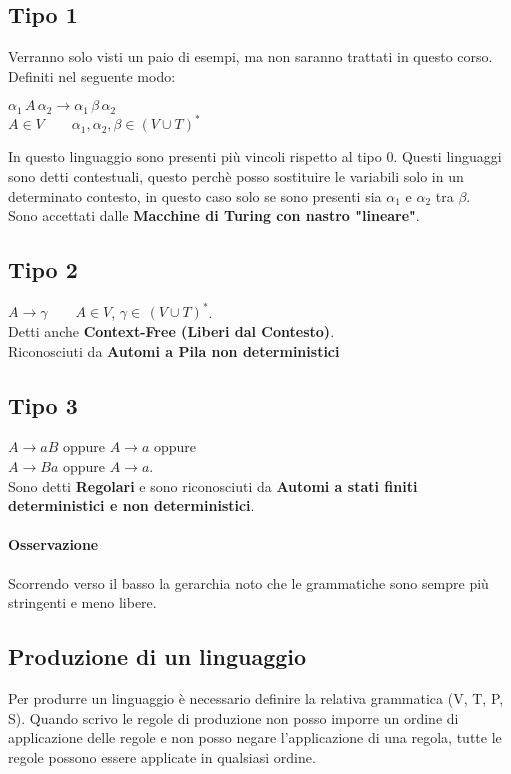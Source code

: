 \subsection{Tipo 1}
Verranno solo visti un paio di esempi, ma non saranno trattati in questo corso.
\\ Definiti nel seguente modo:
\begin{center}
    $\alpha_1 \, A \, \alpha_2 \rightarrow \alpha_1 \, \beta \, \alpha_2$
    \\ $A\in V \qquad \alpha_1, \alpha_2, \beta \in (V \cup T)^*$
\end{center}
In questo linguaggio sono presenti più vincoli rispetto al tipo 0.
Questi linguaggi sono detti contestuali, questo perchè posso sostituire le variabili solo in un determinato contesto, in questo caso
solo se sono presenti sia $\alpha_1$ e $\alpha_2$ tra $\beta$.
\\ Sono accettati dalle \textbf{Macchine di Turing con nastro "lineare"}.
\subsection{Tipo 2}
$A\rightarrow \gamma \qquad A \in V$, $\gamma \in \, (V \cup T)^*$.
\\ Detti anche \textbf{Context-Free (Liberi dal Contesto)}.
\\ Riconosciuti da \textbf{Automi a Pila non deterministici}
\subsection{Tipo 3}
$A \rightarrow aB$ oppure $A \rightarrow a$ oppure
\\ $A \rightarrow Ba$ oppure $A \rightarrow a$.
\\Sono detti \textbf{Regolari} e sono riconosciuti da \textbf{Automi
a stati finiti deterministici e non deterministici}.

\paragraph*{Osservazione}Scorrendo verso il basso la gerarchia noto che le grammatiche sono sempre più
stringenti e meno libere.

\subsection*{Produzione di un linguaggio}
Per produrre un linguaggio è necessario definire la relativa grammatica (V, T, P, S).
Quando scrivo le regole di produzione non posso imporre un ordine di applicazione delle regole e non posso
negare l'applicazione di una regola, tutte le regole possono essere applicate in qualsiasi ordine.
